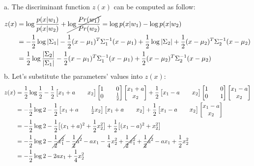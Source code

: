 \Answer[number={14}]
a. The discriminant function \(z(x)\) can be computed as follow:
\begin{align*}
    z(x)
    &=\log{\frac{p(x|w_1)}{p(x|w_2)}}+\cancel{\log{\frac{Pr(w_1)}{Pr(w_2)}}}
    =\log{p(x|w_1)}-\log{p(x|w_2)}\\
    &=-\frac{1}{2}\log{|\Sigma_1|}-\frac{1}{2}(x-\mu_1)^T\Sigma_1^{-1}(x-\mu_1)+\frac{1}{2}\log{|\Sigma_2|}+\frac{1}{2}(x-\mu_2)^T\Sigma_2^{-1}(x-\mu_2)\\
    &=\frac{1}{2}\log{\frac{|\Sigma_2|}{|\Sigma_1|}}-\frac{1}{2}(x-\mu_1)^T\Sigma_1^{-1}(x-\mu_1)+\frac{1}{2}(x-\mu_2)^T\Sigma_2^{-1}(x-\mu_2)
\end{align*}
b. Let's substitute the parameters' values into \(z(x)\):
\begin{align*}
    z(x)
    &=\frac{1}{2}\log{\frac{1}{2}}-\frac{1}{2}
    \begin{bmatrix}
        x_1+a && x_2
    \end{bmatrix}
    \begin{bmatrix}
        1 && 0 \\ 0 && \frac{1}{2}
    \end{bmatrix}
    \begin{bmatrix}
        x_1+a \\ x_2
    \end{bmatrix}
    +\frac{1}{2}
    \begin{bmatrix}
        x_1-a && x_2
    \end{bmatrix}
    \begin{bmatrix}
        1 && 0 \\ 0 && 1
    \end{bmatrix}
    \begin{bmatrix}
        x_1-a \\ x_2
    \end{bmatrix}\\
    &=-\frac{1}{2}\log{2}-\frac{1}{2}
    \begin{bmatrix}
        x_1+a && \frac{1}{2}x_2
    \end{bmatrix}
    \begin{bmatrix}
        x_1+a && x_2
    \end{bmatrix}
    +\frac{1}{2}
    \begin{bmatrix}
        x_1-a && x_2
    \end{bmatrix}
    \begin{bmatrix}
        x_1-a \\ x_2
    \end{bmatrix}\\
    &=-\frac{1}{2}\log{2}-\frac{1}{2}\bigl[(x_1+a)^2+\frac{1}{2}x_2^2\bigr]+\frac{1}{2}\bigl[(x_1-a)^2+x_2^2\bigr]\\
    &=-\frac{1}{2}\log{2}-\cancel{\frac{1}{2}x_1^2}-\cancel{\frac{1}{2}a^2}-ax_1-\frac{1}{4}x_2^2+\cancel{\frac{1}{2}x_1^2}+\cancel{\frac{1}{2}a^2}-ax_1+\frac{1}{2}x_2^2\\
    &=-\frac{1}{2}\log{2}-2ax_1+\frac{1}{4}x_2^2
\end{align*}

